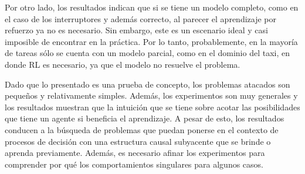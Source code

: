 Por otro lado, los resultados indican que si se tiene un modelo completo, como en el caso de los interruptores y además correcto, al parecer el aprendizaje por refuerzo ya no es necesario. Sin embargo, este es un escenario ideal y casi imposible de encontrar en la práctica. Por lo tanto, probablemente, en la mayoría de tareas sólo se cuenta con un modelo parcial, como en el dominio del taxi, en donde RL es necesario, ya que 
el modelo no resuelve el problema. 

Dado que lo presentado es una prueba de concepto, los problemas atacados
son pequeños y relativamente simples. Además, los experimentos son muy generales y los resultados muestran  que la intuición que se tiene sobre acotar las posibilidades que tiene un agente si beneficia el aprendizaje.
A pesar de esto, los resultados conducen a la búsqueda
de problemas que puedan ponerse en el contexto de procesos de decisión
con una estructura causal subyacente que se brinde o aprenda previamente. Además,
es necesario afinar los experimentos para comprender por qué los comportamientos singulares para algunos casos.


